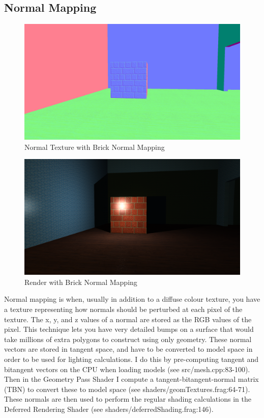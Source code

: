 \documentclass[oneside]{book}
\begin{document}
    \subsection{Normal Mapping} \label{normal-mapping}
      \begin{figure}[h!]
        \centering
        \includegraphics[width=1.0\textwidth]{normal_mapping_normal}
        \caption{Normal Texture with Brick Normal Mapping}
      \end{figure}

      \begin{figure}[h!]
        \centering
        \includegraphics[width=1.0\textwidth]{normal_mapping_accum}
        \caption{Render with Brick Normal Mapping}
        \label{brick-normal-map}
      \end{figure}

      Normal mapping is when, usually in addition to a diffuse colour texture, you have a texture representing how normals should be perturbed at each pixel of the texture. The x, y, and z values of a normal are stored as the RGB values of the pixel. This technique lets you have very detailed bumps on a surface that would take millions of extra polygons to construct using only geometry. These normal vectors are stored in tangent space, and have to be converted to model space in order to be used for lighting calculations. I do this by pre-computing tangent and bitangent vectors on the CPU when loading models (see src/mesh.cpp:83-100). Then in the Geometry Pass Shader I compute a tangent-bitangent-normal matrix (TBN) to convert these to model space (see shaders/geomTextures.frag:64-71). These normals are then used to perform the regular shading calculations in the Deferred Rendering Shader (see shaders/deferredShading.frag:146).
\end{document}
